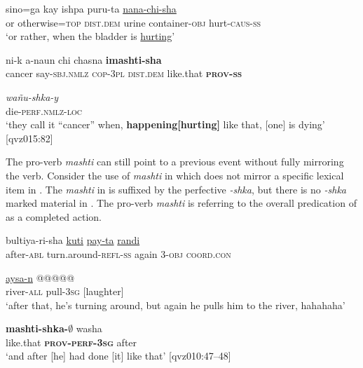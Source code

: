 \documentclass[output=paper]{langscibook}
\begin{document}
\ea%
    \label{ex:rice:13}
\ea \label{ex:rice:13a}
 {sino=ga} {kay} {ishpa} {puru-ta} \uline{nana-chi-sha}\\
{or}  {otherwise=\textsc{top}} {\textsc{dist.dem}} {urine} {container-\textsc{obj}} {hurt-\textsc{caus-ss}}\\
\glt  ‘or rather, when the bladder is \uline{hurting}’
\medskip

\ex \label{ex:rice:13b}
 {ni-k} {a-naun} {chi} {chasna} {\textbf{imashti-sha}} \\
{cancer} {say-\textsc{sbj.nmlz}} {\textsc{cop-3pl}}  {\textsc{dist.dem}}  {like.that}  {\textbf{\textsc{prov-ss}}}\\
\medskip

\gll \textit{wañu-shka-y} \\
{die-\textsc{perf.nmlz-loc}}\\
\glt ‘they call it “cancer” when, \textbf{happening[hurting]} like that, [one] is dying’ [qvz015:82]
\z
\z

The pro-verb \textit{mashti} can still point to a previous event without fully mirroring the verb. Consider the use of \textit{mashti} in  which does not mirror a specific lexical item in . The \textit{mashti} in  is suffixed by the perfective \textit{{}-shka}, but there is no \textit{{}-shka} marked material in . The pro-verb \textit{mashti} is referring to the overall predication of  as a completed action.

\ea%
\label{ex:rice:14}
\ea \label{ex:rice:14a}
 {bultiya-ri-sha} {\uline{kuti}} {\uline{pay-ta}} {\uline{randi}} \\
{after-\textsc{abl}}  {turn.around-\textsc{refl-ss}}  {again}  {3\textsc{{}-obj}}  {\textsc{coord.con}} \\
\medskip

 {\uline{aysa-n}}  {@@@@@}\\
 {river-\textsc{all}} {pull{\textsc{-3sg}}}  {[laughter]}\\
\glt ‘after that, he’s turning around, but again he pulls him to the river, hahahaha’
\medskip

\ex \label{ex:rice:14b}
 {\textbf{mashti-shka-${\emptyset}$}} {washa}\\
{like.that}  {{\textbf{\textsc{prov-perf}}}{\textbf{{}{\textsc{-3sg}}}}}    {after}\\
\glt ‘and after [he] had done [it] like that’ [qvz010:47--48]
\z
\z
\end{document}
